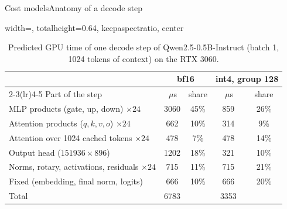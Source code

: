 \documentclass[aspectratio=169,10pt]{beamer}
\newcommand{\us}{\,$\mu$s}
\begin{document}
\begin{frame}{Cost models}{Anatomy of a decode step}
\begin{table}
\centering
\begin{adjustbox}{width=\linewidth, totalheight=0.64\textheight, keepaspectratio, center}
\centering
\small
\begin{tabular}{lcccc}
\toprule
& \multicolumn{2}{c}{bf16} & \multicolumn{2}{c}{int4, group 128} \\
\cmidrule(lr){2-3}\cmidrule(lr){4-5}
Part of the step & \us & share & \us & share \\
\midrule
MLP products (gate, up, down) $\times24$          & 3060 & 45\% & 859  & 26\% \\
Attention products ($q,k,v,o$) $\times24$          & 662  & 10\% & 314  & 9\% \\
Attention over 1024 cached tokens $\times24$       & 478  & 7\%  & 478  & 14\% \\
Output head ($151936\times896$)                    & 1202 & 18\% & 321  & 10\% \\
Norms, rotary, activations, residuals $\times24$   & 715  & 11\% & 715  & 21\% \\
Fixed (embedding, final norm, logits)              & 666  & 10\% & 666  & 20\% \\
\midrule
Total                                              & 6783 &      & 3353 &      \\
\bottomrule
\end{tabular}
\end{adjustbox}
\caption{Predicted GPU time of one decode step of Qwen2.5-0.5B-Instruct (batch 1, 1024 tokens of
context) on the RTX 3060.}\label{tab:anatomy}
\end{table}
\end{frame}
\end{document}
